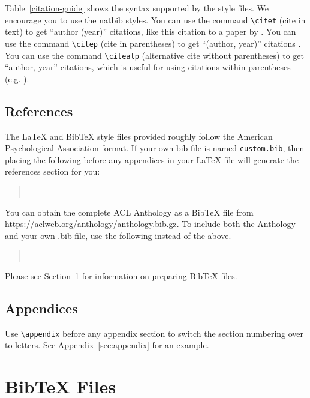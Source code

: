 \documentclass[11pt]{article}
\begin{document}
Table~\ref{citation-guide} shows the syntax supported by the style files.
We encourage you to use the natbib styles.
You can use the command \verb|\citet| (cite in text) to get ``author (year)'' citations, like this citation to a paper by \citet{Gusfield:97}.
You can use the command \verb|\citep| (cite in parentheses) to get ``(author, year)'' citations \citep{Gusfield:97}.
You can use the command \verb|\citealp| (alternative cite without parentheses) to get ``author, year'' citations, which is useful for using citations within parentheses (e.g. \citealp{Gusfield:97}).

\subsection{References}

\nocite{Ando2005,augenstein-etal-2016-stance,andrew2007scalable,rasooli-tetrault-2015,goodman-etal-2016-noise,harper-2014-learning}

The \LaTeX{} and Bib\TeX{} style files provided roughly follow the American Psychological Association format.
If your own bib file is named \texttt{custom.bib}, then placing the following before any appendices in your \LaTeX{} file will generate the references section for you:
\begin{quote}
\begin{verbatim}


\end{verbatim}
\end{quote}
You can obtain the complete ACL Anthology as a Bib\TeX{} file from \url{https://aclweb.org/anthology/anthology.bib.gz}.
To include both the Anthology and your own .bib file, use the following instead of the above.
\begin{quote}
\begin{verbatim}


\end{verbatim}
\end{quote}
Please see Section~\ref{sec:bibtex} for information on preparing Bib\TeX{} files.

\subsection{Appendices}

Use \verb|\appendix| before any appendix section to switch the section numbering over to letters. See Appendix~\ref{sec:appendix} for an example.

\section{Bib\TeX{} Files}
\label{sec:bibtex}
\end{document}
